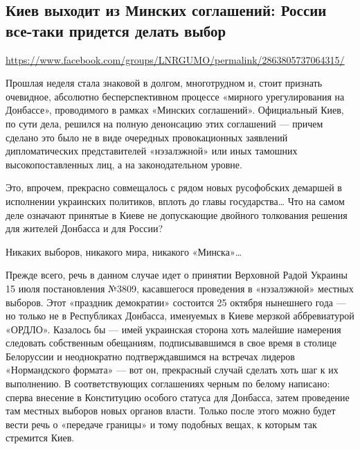 
 
\subsection{Киев выходит из Минских соглашений: России все-таки придется делать выбор}
\label{sec:21_07_2020.fb.lnr.17}
\url{https://www.facebook.com/groups/LNRGUMO/permalink/2863805737064315/}
  

Прошлая неделя стала знаковой в долгом, многотрудном и, стоит признать
очевидное, абсолютно бесперспективном процессе «мирного урегулирования на
Донбассе», проводимого в рамках «Минских соглашений». Официальный Киев, по сути
дела, решился на полную денонсацию этих соглашений --- причем сделано это было не
в виде очередных провокационных заявлений дипломатических представителей
«нэзалэжной» или иных тамошних высокопоставленных лиц, а на законодательном
уровне.

Это, впрочем, прекрасно совмещалось с рядом новых русофобских демаршей в
исполнении украинских политиков, вплоть до главы государства… Что на самом деле
означают принятые в Киеве не допускающие двойного толкования решения для
жителей Донбасса и для России?

Никаких выборов, никакого мира, никакого «Минска»…

Прежде всего, речь в данном случае идет о принятии Верховной Радой Украины 15
июля постановления №3809, касавшегося проведения в «нэзалэжной» местных
выборов. Этот «праздник демократии» состоится 25 октября нынешнего года --- но
только не в Республиках Донбасса, именуемых в Киеве мерзкой аббревиатурой
«ОРДЛО». Казалось бы --- имей украинская сторона хоть малейшие намерения
следовать собственным обещаниям, подписывавшимся в свое время в столице
Белоруссии и неоднократно подтверждавшимся на встречах лидеров «Нормандского
формата» --- вот он, прекрасный случай сделать хоть шаг к их выполнению. В
соответствующих соглашениях черным по белому написано: сперва внесение в
Конституцию особого статуса для Донбасса, затем проведение там местных выборов
новых органов власти. Только после этого можно будет вести речь о «передаче
границы» и тому подобных вещах, к которым так стремится Киев.

